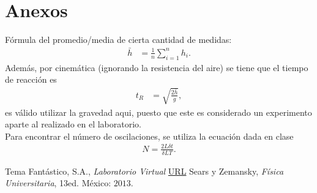 \documentclass[conference]{IEEEtran}
\begin{document}

\section{Anexos}
    Fórmula del promedio/media de cierta cantidad de medidas:
    \begin{align}
	 	\bar{h} &= \frac{1}{n} \sum_{i=1} ^n h_i .   	\label{mean}
    \end{align}
    Además, por cinemática (ignorando la resistencia del aire) se tiene que el tiempo de reacción es
    \begin{align}
    	t_R &= \sqrt{\frac{2\bar{h}}{g}}, \label{tr}
    \end{align}
    es válido utilizar la gravedad aqui, puesto que este es considerado un experimento aparte al realizado en el laboratorio. \\
    Para encontrar el número de oscilaciones, se utiliza la ecuación dada en clase
    \begin{align}
    	N = \frac{2L\delta t}{\delta L T}. \label{N}
    \end{align}
    
    
\begin{thebibliography}{00}
 Tema Fantástico, S.A., \textit{Laboratorio Virtual} \href{https://labovirtual.blogspot.com/search/label/El\%20p\%C3\%A9ndulo\%20simple}{URL}
 Sears y Zemansky, \textit{Física Universitaria}, 13ed. México: $2013$.
\end{thebibliography}
\end{document}
